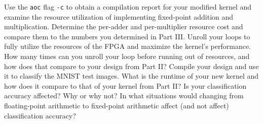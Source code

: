 \documentclass[epsfig,10pt,fullpage]{article}
\newcommand{\CommonDocsPath}{../../common/docs}
\begin{document}
Use the \texttt{aoc} flag \texttt{-c} to obtain a compilation report for your modified kernel and examine the resource utilization of
implementing fixed-point addition and multiplication. Determine the per-adder and per-multiplier resource cost and compare them 
to the numbers you determined in Part III.
Unroll your loops to fully utilize the resources of the FPGA and maximize the kernel's performance.
How many times can you unroll your loop before running out of resources, and how does that compare to your design from Part II?
Compile your design and use it to classify the MNIST test images.
What is the runtime of your new kernel and how does it compare to that of your kernel from Part II?
Is your classification accuracy affected? Why or why not? In what situations would changing from
floating-point arithmetic to fixed-point arithmetic affect (and not affect) classification accuracy?



\end{document}
